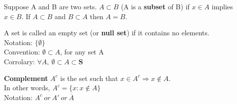 \documentclass[12pt, oneside, letterpaper]{notes}
\begin{document}
\begin{mydef}
Suppose A and B are two sets.  $A \subset B$ (A is a \textbf{subset} of B) if $x \in A$ implies $x \in B$. If $A \subset B$ and $B \subset A$ then $A=B$.
\end{mydef}

\begin{mydef}
A set is called an empty set (or \textbf{null set}) if it contains no elements.\\
\indent Notation: $\{ \emptyset \}$ \\
\indent Convention: $\emptyset \subset A$, for any set A \\
\indent Corrolary: $\forall A, \: \emptyset \subset A \subset \textbf{S}$
\end{mydef}

\begin{mydef}
\textbf{Complement} $A^c$ is the set such that $x \in A^c \Rightarrow x \notin A$.\\
\indent In other words, $A^c = \{ x : x \notin A \}$ \\
\indent Notation: $A^c \: or \: A' \: or \: \overline{A}$
\end{mydef}
\end{document}
